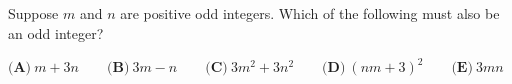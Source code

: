 Suppose $m$ and $n$ are positive odd integers. Which of the following must also be an odd integer?

$\textbf{(A)}\ m+3n\qquad\textbf{(B)}\ 3m-n\qquad\textbf{(C)}\ 3m^2+3n^2\qquad\textbf{(D)}\ (nm+3)^2\qquad\textbf{(E)}\ 3mn$
